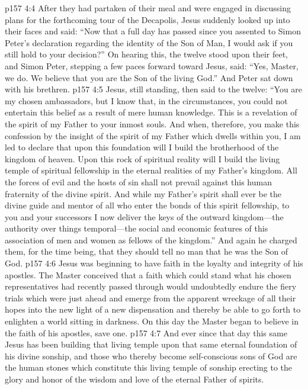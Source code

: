 \vs p157 4:4 After they had partaken of their meal and were engaged in discussing plans for the forthcoming tour of the Decapolis, Jesus suddenly looked up into their faces and said: \textcolor{ubdarkred}{“Now that a full day has passed since you assented to Simon Peter’s declaration regarding the identity of the Son of Man, I would ask if you still hold to your decision?”} On hearing this, the twelve stood upon their feet, and Simon Peter, stepping a few paces forward toward Jesus, said: “Yes, Master, we do. We believe that you are the Son of the living God.” And Peter sat down with his brethren.\plusone
\vs p157 4:5 Jesus, still standing, then said to the twelve: \textcolor{ubdarkred}{“You are my chosen ambassadors, but I know that, in the circumstances, you could not entertain this belief as a result of mere human knowledge. This is a revelation of the spirit of my Father to your inmost souls. And when, therefore, you make this confession by the insight of the spirit of my Father which dwells within you, I am led to declare that upon this foundation will I build the brotherhood of the kingdom of heaven. Upon this rock of spiritual reality will I build the living temple of spiritual fellowship in the eternal realities of my Father’s kingdom. All the forces of evil and the hosts of sin shall not prevail against this human fraternity of the divine spirit. And while my Father’s spirit shall ever be the divine guide and mentor of all who enter the bonds of this spirit fellowship, to you and your successors I now deliver the keys of the outward kingdom---the authority over things temporal---the social and economic features of this association of men and women as fellows of the kingdom.”} And again he charged them, for the time being, that they should tell no man that he was the Son of God.
\pc \vs p157 4:6 Jesus was beginning to have faith in the loyalty and integrity of his apostles. The Master conceived that a faith which could stand what his chosen representatives had recently passed through would undoubtedly endure the fiery trials which were just ahead and emerge from the apparent wreckage of all their hopes into the new light of a new dispensation and thereby be able to go forth to enlighten a world sitting in darkness. On this day the Master began to believe in the faith of his apostles, save one.
\vs p157 4:7 And ever since that day this same Jesus has been building that living temple upon that same eternal foundation of his divine sonship, and those who thereby become self\hyp{}conscious sons of God are the human stones which constitute this living temple of sonship erecting to the glory and honor of the wisdom and love of the eternal Father of spirits.
